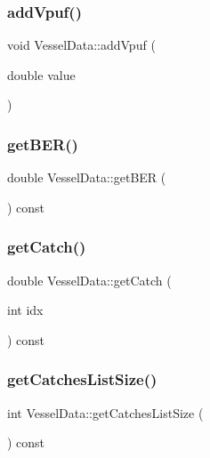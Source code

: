 \subsubsection{\texorpdfstring{addVpuf()}{addVpuf()}}
{\footnotesize\ttfamily void Vessel\+Data\+::add\+Vpuf (\begin{DoxyParamCaption}\item[{double}]{value }\end{DoxyParamCaption})}

\mbox{\label{class_vessel_data_acfdee7224cd6caa5dcb21a8b3bb72c80}} 
\subsubsection{\texorpdfstring{getBER()}{getBER()}}
{\footnotesize\ttfamily double Vessel\+Data\+::get\+B\+ER (\begin{DoxyParamCaption}{ }\end{DoxyParamCaption}) const}

\mbox{\label{class_vessel_data_a64e1cbc37eae7b5a57bf63a5f39f430a}} 
\subsubsection{\texorpdfstring{getCatch()}{getCatch()}}
{\footnotesize\ttfamily double Vessel\+Data\+::get\+Catch (\begin{DoxyParamCaption}\item[{int}]{idx }\end{DoxyParamCaption}) const\hspace{0.3cm}{\ttfamily [inline]}}

\mbox{\label{class_vessel_data_a36b2927e5e749d13c2f625e6ff8fbdba}} 
\subsubsection{\texorpdfstring{getCatchesListSize()}{getCatchesListSize()}}
{\footnotesize\ttfamily int Vessel\+Data\+::get\+Catches\+List\+Size (\begin{DoxyParamCaption}{ }\end{DoxyParamCaption}) const\hspace{0.3cm}{\ttfamily [inline]}}

